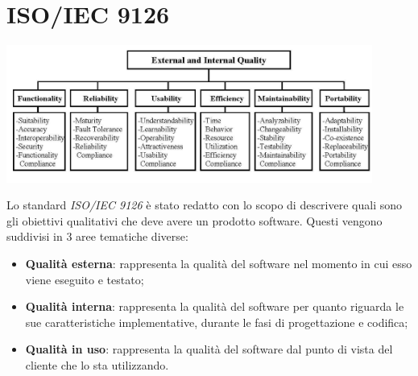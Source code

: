 \newpage
\section{ISO/IEC 9126}

\begin{center}
\includegraphics[keepaspectratio = true, width=12cm]{9126.png}
\end{center}	

Lo standard \textit{ISO/IEC 9126} è stato redatto con lo scopo di descrivere quali sono gli obiettivi qualitativi che deve avere un prodotto software. Questi vengono suddivisi in 3 aree tematiche diverse:
\begin{itemize}
\item\textbf{Qualità esterna}: rappresenta la qualità del software nel momento in cui esso viene eseguito e testato;
\item\textbf{Qualità interna}: rappresenta la qualità del software per quanto riguarda le sue caratteristiche implementative, durante le fasi di progettazione e codifica; 
\item\textbf{Qualità in uso}: rappresenta la qualità del software dal punto di vista del cliente che lo sta utilizzando.
\end{itemize}

